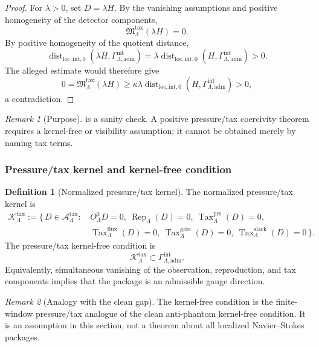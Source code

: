 \documentclass[11pt]{article}
\numberwithin{equation}{section}
\theoremstyle{definition}
\newtheorem{definition}[definition]{Definition}
\theoremstyle{remark}
\newtheorem{remark}[remark]{Remark}
\newcommand{\loc}{\mathrm{loc}}
\newcommand{\intg}{\mathrm{int}}
\newcommand{\adm}{\mathrm{adm}}
\newcommand{\prs}{\mathrm{prs}}
\newcommand{\Dist}{\operatorname{dist}}
\newcommand{\Gammaadm}{\Gamma^{\intg}_{\Lambda,\adm}}
\begin{document}
\begin{proof}
For \(\lambda>0\), set \(D=\lambda H\).  By the vanishing assumptions and
positive homogeneity of the detector components,
\[
    \mathfrak M^{\mathrm{tax}}_\Lambda(\lambda H)=0.
\]
By positive homogeneity of the quotient distance,
\[
    \Dist_{\loc,\intg,0}(\lambda H,\Gammaadm)
    =
    \lambda\Dist_{\loc,\intg,0}(H,\Gammaadm)>0.
\]
The alleged estimate would therefore give
\[
    0
    =
    \mathfrak M^{\mathrm{tax}}_\Lambda(\lambda H)
    \ge
    \kappa\lambda\Dist_{\loc,\intg,0}(H,\Gammaadm)
    >
    0,
\]
a contradiction.
\end{proof}

\begin{remark}[Purpose]
 is a sanity check.  A
positive pressure/tax coercivity theorem requires a kernel-free or visibility
assumption; it cannot be obtained merely by naming tax terms.
\end{remark}

\subsubsection{Pressure/tax kernel and kernel-free condition}

\begin{definition}[Normalized pressure/tax kernel]
\label{def:pressure-tax-kernel}
The normalized pressure/tax kernel is
\[
\begin{aligned}
    \mathcal K^{\mathrm{tax}}_\Lambda
    :=
    \{\,D\in\mathcal A^{\mathrm{tax}}_\Lambda:\,
    &O^0_\Lambda D=0,\ 
    \operatorname{Rep}_\Lambda(D)=0,\
    \operatorname{Tax}^{\prs}_\Lambda(D)=0,
\\
    &\operatorname{Tax}^{\mathrm{flux}}_\Lambda(D)=0,\
    \operatorname{Tax}^{\mathrm{gate}}_\Lambda(D)=0,\
    \operatorname{Tax}^{\mathrm{slack}}_\Lambda(D)=0
    \,\}.
\end{aligned}
\]
The pressure/tax kernel-free condition is
\[
    \mathcal K^{\mathrm{tax}}_\Lambda\subset\Gammaadm.
\]
Equivalently, simultaneous vanishing of the observation, reproduction, and
tax components implies that the package is an admissible gauge direction.
\end{definition}

\begin{remark}[Analogy with the clean gap]
The kernel-free condition is the finite-window pressure/tax analogue of the
clean anti-phantom kernel-free condition.  It is an assumption in this
section, not a theorem about all localized Navier--Stokes packages.
\end{remark}
\end{document}
